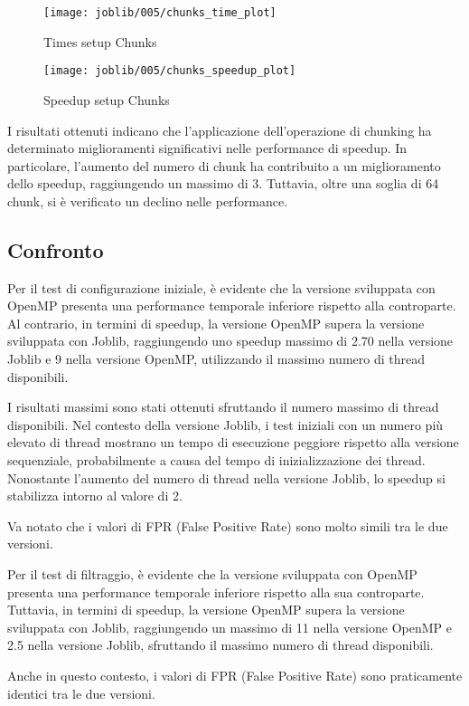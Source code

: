 \begin{figure}[H]
    \centering
    \texttt{[image: joblib/005/chunks\_time\_plot]}
        \caption{Times setup Chunks}\label{fig:005-chunks_time}
    \endminipage\hfill
    \texttt{[image: joblib/005/chunks\_speedup\_plot]}
        \caption{Speedup setup Chunks}\label{fig:005-chunks_speedup}
    \endminipage\hfill
\end{figure}

I risultati ottenuti indicano che l'applicazione dell'operazione di chunking ha determinato miglioramenti
significativi nelle performance di speedup.
In particolare, l'aumento del numero di chunk ha contribuito a un miglioramento dello speedup,
raggiungendo un massimo di 3.
Tuttavia, oltre una soglia di 64 chunk, si è verificato un declino nelle performance.


\subsection{Confronto}\label{subsec:confronto}
Per il test di configurazione iniziale, è evidente che la versione sviluppata con OpenMP presenta una performance
temporale inferiore rispetto alla controparte.
Al contrario, in termini di speedup, la versione OpenMP supera la versione sviluppata con Joblib,
raggiungendo uno speedup massimo di 2.70 nella versione Joblib e 9 nella versione OpenMP, utilizzando il massimo
numero di thread disponibili.

I risultati massimi sono stati ottenuti sfruttando il numero massimo di thread disponibili.
Nel contesto della versione Joblib, i test iniziali con un numero più elevato di thread mostrano un tempo di esecuzione
peggiore rispetto alla versione sequenziale, probabilmente a causa del tempo di inizializzazione dei thread.
Nonostante l'aumento del numero di thread nella versione Joblib, lo speedup si stabilizza intorno al valore di 2.

Va notato che i valori di FPR (False Positive Rate) sono molto simili tra le due versioni.


Per il test di filtraggio, è evidente che la versione sviluppata con OpenMP presenta una performance temporale
inferiore rispetto alla sua controparte.
Tuttavia, in termini di speedup, la versione OpenMP supera la versione sviluppata con Joblib, raggiungendo un
massimo di 11 nella versione OpenMP e 2.5 nella versione Joblib, sfruttando il massimo numero di thread disponibili.

Anche in questo contesto, i valori di FPR (False Positive Rate) sono praticamente identici tra le due versioni.



